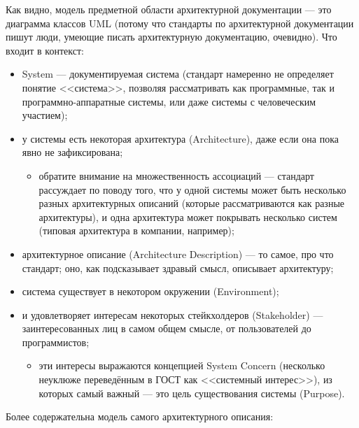 \documentclass[a5paper]{article}
\begin{document}
Как видно, модель предметной области архитектурной документации --- это диаграмма классов UML (потому что стандарты по архитектурной документации пишут люди, умеющие писать архитектурную документацию, очевидно). Что входит в контекст:

\begin{itemize}
    \item System --- документируемая система (стандарт намеренно не определяет понятие <<система>>, позволяя рассматривать как программные, так и программно-аппаратные системы, или даже системы с человеческим участием);
    \item у системы есть некоторая архитектура (Architecture), даже если она пока явно не зафиксирована;
    \begin{itemize}
        \item обратите внимание на множественность ассоциаций --- стандарт рассуждает по поводу того, что у одной системы может быть несколько разных архитектурных описаний (которые рассматриваются как разные архитектуры), и одна архитектура может покрывать несколько систем (типовая архитектура в компании, например);
    \end{itemize}
    \item архитектурное описание (Architecture Description) --- то самое, про что стандарт; оно, как подсказывает здравый смысл, описывает архитектуру;
    \item система существует в некотором окружении (Environment);
    \item и удовлетворяет интересам некоторых стейкхолдеров (Stakeholder) --- заинтересованных лиц в самом общем смысле, от пользователей до программистов;
    \begin{itemize}
        \item эти интересы выражаются концепцией System Concern (несколько неуклюже переведённым в ГОСТ как <<системный интерес>>), из которых самый важный --- это цель существования системы (Purpose).
    \end{itemize}
\end{itemize}

Более содержательна модель самого архитектурного описания:
\end{document}
